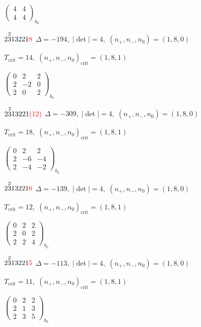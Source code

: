 \documentclass[10pt]{article}
\begin{document}
\hspace{2em}$\left(\begin{smallmatrix}4 & 4 \\ 4 & 4\end{smallmatrix}\right)_{\!b_0}$

$2\overset{2}{3}13221\textcolor{red}{8}$ \quad $\Delta=-194,\; |\det|=4,\; (n_+,n_-,n_0)=(1,8,0)$

\hspace{1em}$T_{\text{crit}}=14,\; (n_+,n_-,n_0)_{\text{crit}}=(1,8,1)$

\hspace{2em}$\left(\begin{smallmatrix}0 & 2 & 2 \\ 2 & -2 & 0 \\ 2 & 0 & 2\end{smallmatrix}\right)_{\!b_0}$

$2\overset{2}{3}13221\textcolor{red}{(12)}$ \quad $\Delta=-309,\; |\det|=4,\; (n_+,n_-,n_0)=(1,8,0)$

\hspace{1em}$T_{\text{crit}}=18,\; (n_+,n_-,n_0)_{\text{crit}}=(1,8,1)$

\hspace{2em}$\left(\begin{smallmatrix}0 & 2 & 2 \\ 2 & -6 & -4 \\ 2 & -4 & -2\end{smallmatrix}\right)_{\!b_0}$

$2\overset{2}{3}13221\textcolor{red}{6}$ \quad $\Delta=-139,\; |\det|=4,\; (n_+,n_-,n_0)=(1,8,0)$

\hspace{1em}$T_{\text{crit}}=12,\; (n_+,n_-,n_0)_{\text{crit}}=(1,8,1)$

\hspace{2em}$\left(\begin{smallmatrix}0 & 2 & 2 \\ 2 & 0 & 2 \\ 2 & 2 & 4\end{smallmatrix}\right)_{\!b_0}$

$2\overset{2}{3}13221\textcolor{red}{5}$ \quad $\Delta=-113,\; |\det|=4,\; (n_+,n_-,n_0)=(1,8,0)$

\hspace{1em}$T_{\text{crit}}=11,\; (n_+,n_-,n_0)_{\text{crit}}=(1,8,1)$

\hspace{2em}$\left(\begin{smallmatrix}0 & 2 & 2 \\ 2 & 1 & 3 \\ 2 & 3 & 5\end{smallmatrix}\right)_{\!b_0}$
\end{document}
